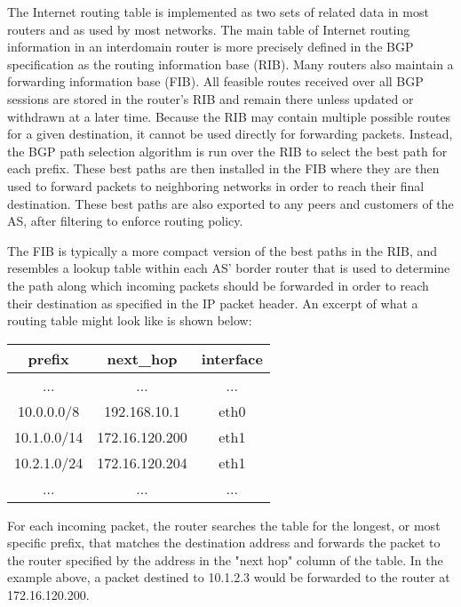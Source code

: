 The Internet routing table is implemented as two sets of related data in most routers and as used by most networks. The main table of Internet routing information in an interdomain router is more precisely defined in the BGP specification \cite{BGP RFC} as the routing information base (RIB). Many routers also maintain a forwarding information base (FIB). All feasible routes received over all BGP sessions are stored in the router's RIB and remain there unless updated or withdrawn at a later time. Because the RIB may contain multiple possible routes for a given destination, it cannot be used directly for forwarding packets. Instead, the BGP path selection algorithm is run over the RIB to select the best path for each prefix. These best paths are then installed in the FIB where they are then used to forward packets to neighboring networks in order to reach their final destination. These best paths are also exported to any peers and customers of the AS, after filtering to enforce routing policy.

The FIB is typically a more compact version of the best paths in the RIB, and resembles a lookup table within each AS' border router that is used to determine the path along which incoming packets should be forwarded in order to reach their destination as specified in the IP packet header. An excerpt of what a routing table might look like is shown below:

\begin{tabular}{c | c | c}
    prefix & next\_hop & interface \\
    \hline
    ... & ... & ... \\
    10.0.0.0/8  & 192.168.10.1   & eth0 \\
	10.1.0.0/14 & 172.16.120.200 & eth1 \\
	10.2.1.0/24 & 172.16.120.204 & eth1 \\
    ... & ... & ...
\end{tabular}

For each incoming packet, the router searches the table for the longest, or most specific prefix, that matches the destination address and forwards the packet to the router specified by the address in the "next hop" column of the table. In the example above, a packet destined to 10.1.2.3 would be forwarded to the router at 172.16.120.200.

